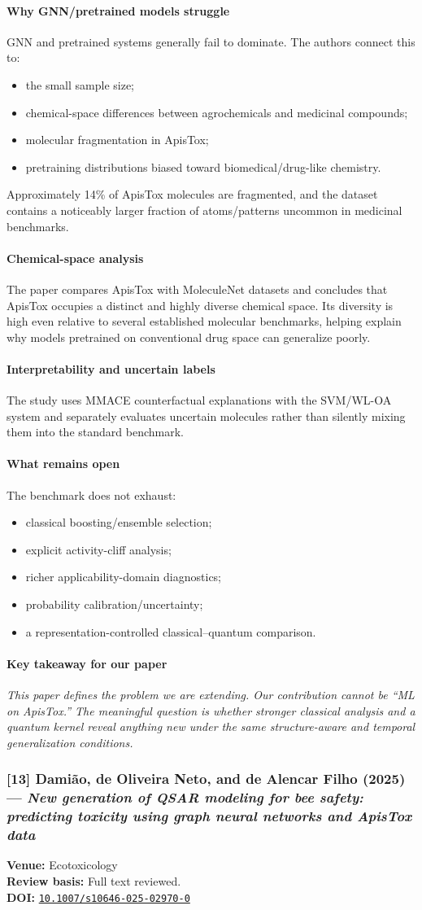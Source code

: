 \documentclass[11pt]{article}
\newcommand{\reviewfield}[2]{\paragraph{#1}#2}
\newcommand{\keytakeaway}[1]{\paragraph{Key takeaway for our paper}\emph{#1}}
\newcommand{\paperdoi}[1]{\href{https://doi.org/#1}{\texttt{#1}}}
\begin{document}
\reviewfield{Why GNN/pretrained models struggle}{
GNN and pretrained systems generally fail to dominate. The authors connect this to:
\begin{itemize}
    \item the small sample size;
    \item chemical-space differences between agrochemicals and medicinal compounds;
    \item molecular fragmentation in ApisTox;
    \item pretraining distributions biased toward biomedical/drug-like chemistry.
\end{itemize}
Approximately 14\% of ApisTox molecules are fragmented, and the dataset contains a noticeably larger fraction of atoms/patterns uncommon in medicinal benchmarks.
}

\reviewfield{Chemical-space analysis}{
The paper compares ApisTox with MoleculeNet datasets and concludes that ApisTox occupies a distinct and highly diverse chemical space. Its diversity is high even relative to several established molecular benchmarks, helping explain why models pretrained on conventional drug space can generalize poorly.
}

\reviewfield{Interpretability and uncertain labels}{
The study uses MMACE counterfactual explanations with the SVM/WL-OA system and separately evaluates uncertain molecules rather than silently mixing them into the standard benchmark.
}

\reviewfield{What remains open}{
The benchmark does not exhaust:
\begin{itemize}
    \item classical boosting/ensemble selection;
    \item explicit activity-cliff analysis;
    \item richer applicability-domain diagnostics;
    \item probability calibration/uncertainty;
    \item a representation-controlled classical--quantum comparison.
\end{itemize}
}

\keytakeaway{This paper defines the problem we are extending. Our contribution cannot be ``ML on ApisTox.'' The meaningful question is whether stronger classical analysis and a quantum kernel reveal anything new under the same structure-aware and temporal generalization conditions.}

\subsubsection{[13] Damião, de Oliveira Neto, and de Alencar Filho (2025) --- \textit{New generation of QSAR modeling for bee safety: predicting toxicity using graph neural networks and ApisTox data}}
\textbf{Venue:} Ecotoxicology\\
\textbf{Review basis:} Full text reviewed.\\
\textbf{DOI:} \paperdoi{10.1007/s10646-025-02970-0}
\end{document}
